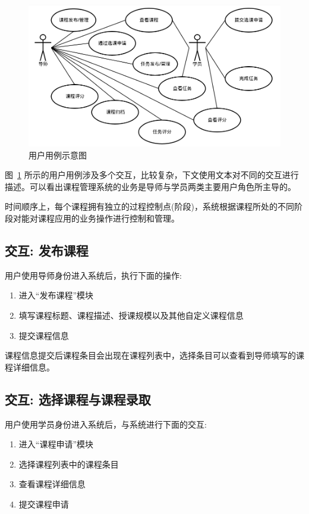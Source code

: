 \begin{figure}[!hbp]
  \begin{center}
    \includegraphics[scale=0.5]{figures/diagram-use-case.png}
    \caption{用户用例示意图\label{UseCase}}
  \end{center}
\end{figure}

图~\ref{UseCase} 所示的用户用例涉及多个交互，比较复杂，下文使用文本对不同的交互进行描述。可以看出课程管理系统的业务是导师与学员两类主要用户角色所主导的。

时间顺序上，每个课程拥有独立的过程控制点(阶段)，系统根据课程所处的不同阶段对能对课程应用的业务操作进行控制和管理。

\subsection {交互: 发布课程}

用户使用导师身份进入系统后，执行下面的操作:

\begin{enumerate}
  \item 进入“发布课程”模块
  \item 填写课程标题、课程描述、授课规模以及其他自定义课程信息
  \item 提交课程信息
\end{enumerate}

课程信息提交后课程条目会出现在课程列表中，选择条目可以查看到导师填写的课程详细信息。

\subsection {交互: 选择课程与课程录取}

用户使用学员身份进入系统后，与系统进行下面的交互:

\begin{enumerate}
  \item 进入“课程申请”模块
  \item 选择课程列表中的课程条目
  \item 查看课程详细信息
  \item 提交课程申请
\end{enumerate}

